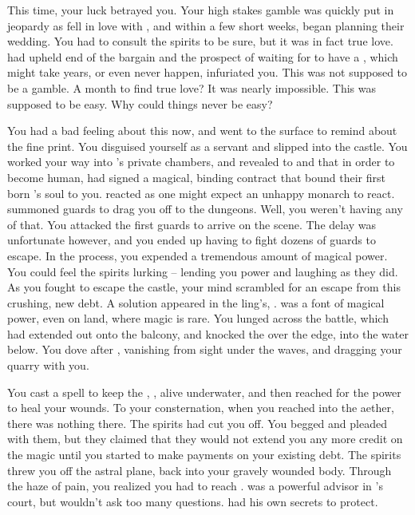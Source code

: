 \documentclass[char]{NeptuneBall}
\begin{document}
This time, your luck betrayed you. Your high stakes gamble was quickly put in jeopardy as \cEric{} fell in love with \cAriel{}, and within a few short weeks, began planning their wedding. You had to consult the spirits to be sure, but it was in fact true love. \cAriel{} had upheld \cAriel{\them} end of the bargain and the prospect of waiting for \cAriel{\them} to have a \cArielsSon{\offspring}, which might take years, or even never happen, infuriated you. This was not supposed to be a gamble. A month to find true love? It was nearly impossible. This was supposed to be easy. Why could things never be easy?

You had a bad feeling about this now, and went to the surface to remind \cAriel{} about the fine print. You disguised yourself as a servant and slipped into the castle. You worked your way into \cEric{}'s private chambers, and revealed to \cAriel{} and \cEric{} that in order to become human, \cAriel{} had signed a magical, binding contract that bound their first born \cArielsSon{\offspring}'s soul to you. \cEric{} reacted as one might expect an unhappy monarch to react. \cEric{\They} summoned \cEric{\their} guards to drag you off to the dungeons. Well, you weren't having any of that. You attacked the first guards to arrive on the scene. The delay was unfortunate however, and you ended up having to fight dozens of guards to escape. In the process, you expended a tremendous amount of magical power. You could feel the spirits lurking -- lending you power and laughing as they did. As you fought to escape the castle, your mind scrambled for an escape from this crushing, new debt. A solution appeared in the \cEric{\prince}ling's, \cSlave{\sibling}. \cSlave{\They} was a font of magical power, even on land, where magic is rare. You lunged across the battle, which had extended out onto the balcony, and knocked the \cSlave{\kid} over the edge, into the water below. You dove after \cSlave{\them}, vanishing from sight under the waves, and dragging your quarry with you.

You cast a spell to keep the \cSlave{\kid}, \cSlave{}, alive underwater, and then reached for the power to heal your wounds. To your consternation, when you reached into the aether, there was nothing there. The spirits had cut you off. You begged and pleaded with them, but they claimed that they would not extend you any more credit on the magic until you started to make payments on your existing debt. The spirits threw you off the astral plane, back into your gravely wounded body. Through the haze of pain, you realized you had to reach \cManta{}. \cManta{} was a powerful advisor in \cKing{}'s court, but \cManta{\they} wouldn't ask too many questions. \cManta{\They} had his own secrets to protect.
\end{document}
